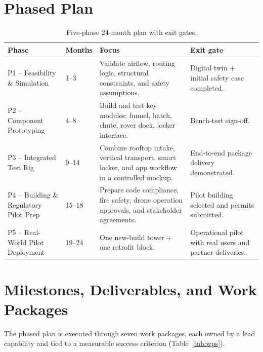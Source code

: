 \documentclass[11pt,a4paper]{report}
\begin{document}
\section{Phased Plan}
\label{sec:phases}

\begin{table}[H]
\centering
\caption{Five-phase 24-month plan with exit gates.}
\label{tab:phases}
\small
\begin{tabularx}{\linewidth}{L{4.4cm} L{1.6cm} X L{4.0cm}}
\toprule
\textbf{Phase} & \textbf{Months} & \textbf{Focus} & \textbf{Exit gate} \\
\midrule
P1 -- Feasibility \& Simulation              & 1--3   & Validate airflow, routing logic, structural constraints, and safety assumptions. & Digital twin + initial safety case completed. \\
P2 -- Component Prototyping                  & 4--8   & Build and test key modules: funnel, hatch, chute, rover dock, locker interface. & Bench-test sign-off. \\
P3 -- Integrated Test Rig                    & 9--14  & Combine rooftop intake, vertical transport, smart locker, and app workflow in a controlled mockup. & End-to-end package delivery demonstrated. \\
P4 -- Building \& Regulatory Pilot Prep      & 15--18 & Prepare code compliance, fire safety, drone operation approvals, and stakeholder agreements. & Pilot building selected and permits submitted. \\
P5 -- Real-World Pilot Deployment            & 19--24 & One new-build tower + one retrofit block.                                        & Operational pilot with real users and partner deliveries. \\
\bottomrule
\end{tabularx}
\end{table}

\section{Milestones, Deliverables, and Work Packages}
\label{sec:wps}

The phased plan is executed through seven work packages, each owned by
a lead capability and tied to a measurable success criterion
(Table~\ref{tab:wps}).
\end{document}
